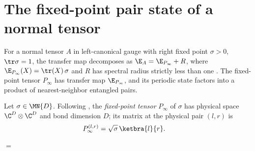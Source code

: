 \section{The fixed-point pair state of a normal tensor}
\label{sec:mps_rfp_fixed_point_pairs}

For a normal tensor $A$ in left-canonical gauge with right fixed point
$\sigma>0$, $\tr\sigma=1$, the transfer map decomposes as
$\E_A=\E_{P_\infty}+R$, where $\E_{P_\infty}(X)=\tr(X)\,\sigma$ and $R$ has
spectral radius strictly less than one \cite{Malz2024Preparation}. The
fixed-point tensor $P_\infty$ has transfer map $\E_{P_\infty}$, and its
periodic state factors into a product of nearest-neighbor entangled pairs.

\begin{definition}
    \label{def:prep_fixed_point_tensor}
    \leanok
    Let $\sigma\in\MN{D}$. Following \cite{Malz2024Preparation}, the
    \emph{fixed-point tensor} $P_\infty$ of $\sigma$ has physical space
    $\C^D\otimes\C^D$ and bond dimension $D$; its matrix at the physical
    pair $(l,r)$ is
    \begin{align}
        P_\infty^{(l,r)}
         & =\sqrt{\sigma}\,\ketbra{l}{r}.
        \notag
    \end{align}
\end{definition}

\begin{center}
    \tenkzkernel
    \begin{tenkz}[rows={wire}, cols=1, bonds=none]
    \end{tenkz}
    \quad $=$ \quad
    \begin{tenkz}[rows={wire}, cols=2, bonds=none]
        \tn[at=(1,1), skin=dot, label pos=s,
            ports={180:virtual:$\alpha$, 90:physical:$l$}]{\sqrt{\sigma}}
        \tn[at=(1,2), skin=none,
            ports={90:physical:$r$, 0:virtual:$\beta$}]{}
    \end{tenkz}
\end{center}

